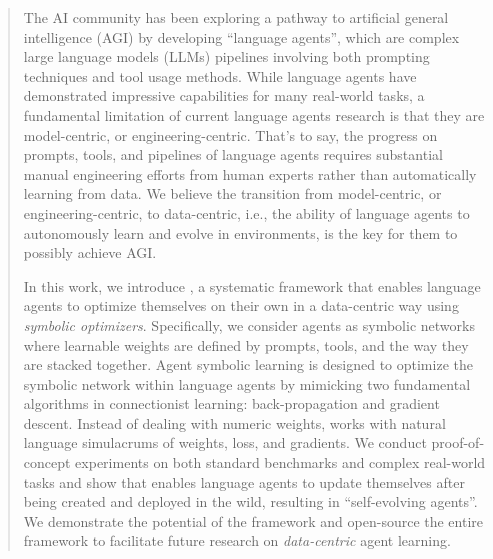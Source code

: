 \begin{abstract}
The AI community has been exploring a pathway to artificial general intelligence (AGI) by developing ``language agents'', which are complex large language models (LLMs) pipelines involving both prompting techniques and tool usage methods. While language agents have demonstrated impressive capabilities for many real-world tasks, a fundamental limitation of current language agents research is that they are model-centric, or engineering-centric. That's to say,  the progress on prompts, tools, and pipelines of language agents requires substantial manual engineering efforts from human experts rather than automatically learning from data. We believe the transition from model-centric, or engineering-centric, to data-centric, i.e., the ability of language agents to autonomously learn and evolve in environments, is the key for them to possibly achieve AGI. 

In this work, we introduce \textit{\baby}, a systematic framework that enables language agents to optimize themselves on their own in a data-centric way using \textit{symbolic optimizers}.  Specifically, we consider agents as symbolic networks where learnable weights are defined by prompts, tools, and the way they are stacked together. Agent symbolic learning is designed to optimize the symbolic network within language agents by mimicking two fundamental algorithms in connectionist learning: back-propagation and gradient descent. Instead of dealing with numeric weights, \baby works with natural language simulacrums of weights, loss, and gradients. We conduct proof-of-concept experiments on both standard benchmarks and complex real-world tasks and show that \baby enables language agents to update themselves after being created and deployed in the wild, resulting in ``self-evolving agents''. We demonstrate the potential of the \baby framework and open-source the entire framework to facilitate future research on \textit{data-centric} agent learning.



\end{abstract}